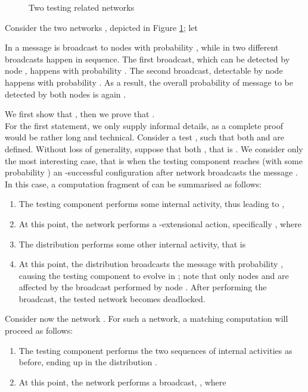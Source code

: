 \documentclass{LMCS}
\begin{document}
  \begin{exa}
  \label{ex:compfail}
  \begin{figure}[t]
  

                                   



   \caption{Two testing related networks}
  \label{fig:compfail}
  \end{figure}
  
  Consider the two networks ,  depicted in Figure \ref{fig:compfail}; 
  let 
  
  \noindent 
  In  a message is 
  broadcast to nodes  with probability , while in  two different broadcasts happen in 
  sequence. The first broadcast, which can be detected by node , happens with probability . 
  The second broadcast, detectable by node  happens with probability . As a result,  
  the overall probability of message  to be detected by both nodes  is again .
  
  We first show that , then we prove that 
  .\\ 
  For the first statement, we only supply informal details, as a complete proof would be 
  rather long and technical. 
  Consider a test , such that both 
   and  are defined. Without loss of generality, suppose that both , that is . 
  We consider only the most interesting case, that is when the testing component 
  reaches (with some probability ) an -successful configuration after network 
   broadcasts the message . In this case, 
  a computation fragment of  can 
  be summarised as follows:
  \begin{enumerate}
  	\item The testing component  performs some internal activity, thus leading to 
  	,
  	\item At this point, the network  
  	performs a -extensional action, specifically , where 
  	
  	
  \item The distribution  
  performs some other internal activity, that is  
  
  \item At this point, the distribution 
  broadcasts the message  with probability , causing 
  	the testing component to evolve in ; note that only nodes  and  are affected by the broadcast performed by node . 
  	After performing the broadcast, the tested network becomes deadlocked.
  \end{enumerate}
  	
	\noindent Consider now the network . 
  	For such a network, a matching computation will proceed as follows:
  	\begin{enumerate}
  	\item The testing component  performs the two sequences of internal activities as before, ending 
  	up in the distribution .
  	\item At this point, the network  performs a broadcast, , where 
		

\end{enumerate}
\end{exa}
\end{document}
